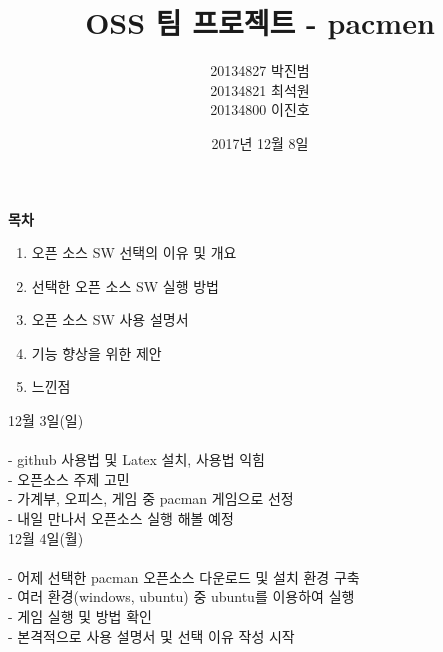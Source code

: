 \documentclass{article}
\begin{document}
\title{\textbf{OSS 팀 프로젝트 - pacmen}}
\author {20134827 박진범\\20134821 최석원\\20134800 이진호}
\date{2017년 12월 8일}
\maketitle



\newpage
\begin{huge}\begin{center}\textbf{목차\\}\end{center}\end{huge}

\begin{enumerate}

\item 오픈 소스 SW 선택의 이유 및 개요
\item 선택한 오픈 소스 SW 실행 방법
 \item 오픈 소스 SW 사용 설명서
\item 기능 향상을 위한 제안
 \item 느낀점 


\end{enumerate}

\newpage
12월 3일(일)\\\\

- github 사용법 및 Latex 설치, 사용법 익힘\\

- 오픈소스 주제 고민\\

- 가계부, 오피스, 게임 중 pacman 게임으로 선정\\

- 내일 만나서 오픈소스 실행 해볼 예정\\


12월 4일(월)\\\\

- 어제 선택한 pacman 오픈소스 다운로드 및 설치 환경 구축\\

- 여러 환경(windows, ubuntu) 중 ubuntu를 이용하여 실행\\

- 게임 실행 및 방법 확인\\

- 본격적으로 사용 설명서 및 선택 이유 작성 시작\\
\end{document}
